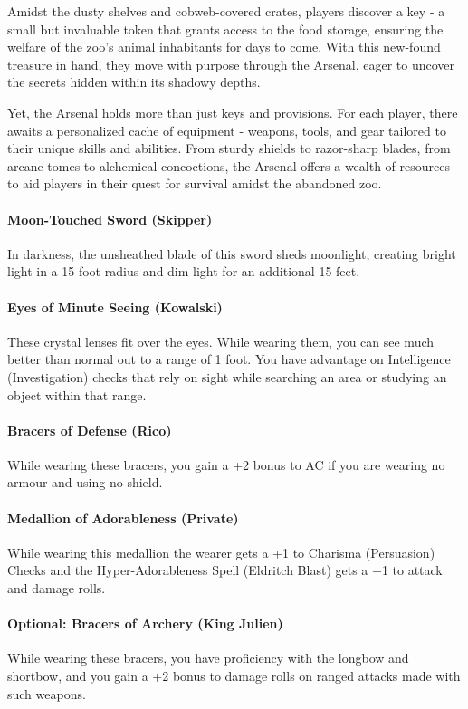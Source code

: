 Amidst the dusty shelves and cobweb-covered crates, players discover a key - a small but invaluable token that grants access to the food storage, ensuring the welfare of the zoo's animal inhabitants for days to come. With this new-found treasure in hand, they move with purpose through the Arsenal, eager to uncover the secrets hidden within its shadowy depths.

Yet, the Arsenal holds more than just keys and provisions. For each player, there awaits a personalized cache of equipment - weapons, tools, and gear tailored to their unique skills and abilities. From sturdy shields to razor-sharp blades, from arcane tomes to alchemical concoctions, the Arsenal offers a wealth of resources to aid players in their quest for survival amidst the abandoned zoo.

\paragraph*{Moon-Touched Sword (Skipper)}
In darkness, the unsheathed blade of this sword sheds moonlight, creating bright light in a 15-foot radius and dim light for an additional 15 feet.

\paragraph*{Eyes of Minute Seeing (Kowalski)}
These crystal lenses fit over the eyes. While wearing them, you can see much better than normal out to a range of 1 foot. You have advantage on Intelligence (Investigation) checks that rely on sight while searching an area or studying an object within that range.

\paragraph*{Bracers of Defense (Rico)}
While wearing these bracers, you gain a +2 bonus to AC if you are wearing no armour and using no shield.

\paragraph*{Medallion of Adorableness (Private)}
While wearing this medallion the wearer gets a +1 to Charisma (Persuasion) Checks and the Hyper-Adorableness Spell (Eldritch Blast) gets a +1 to attack and damage rolls.

\paragraph*{Optional: Bracers of Archery (King Julien)}
While wearing these bracers, you have proficiency with the longbow and shortbow, and you gain a +2 bonus to damage rolls on ranged attacks made with such weapons.

